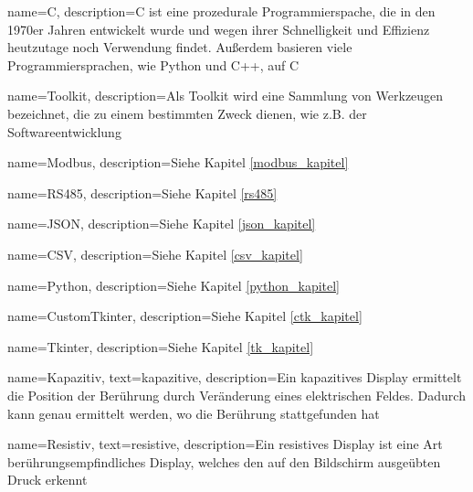 {
	name=C,
	description={C ist eine prozedurale Programmierspache, die in den 1970er Jahren entwickelt wurde und wegen ihrer Schnelligkeit und Effizienz heutzutage noch Verwendung findet. Außerdem basieren viele Programmiersprachen, wie \zB Python und C++, auf C}
}

{
	name=Toolkit,
	description={Als Toolkit wird eine Sammlung von Werkzeugen bezeichnet, die zu einem bestimmten Zweck dienen, wie z.B. der Softwareentwicklung}
}

{
	name=Modbus,
	description={Siehe Kapitel \ref{modbus_kapitel} }
}

{
	name=RS485,
	description={Siehe Kapitel \ref{rs485} }
}

{
	name=JSON,
	description={Siehe Kapitel \ref{json_kapitel} }
}

{
	name=CSV,
	description={Siehe Kapitel \ref{csv_kapitel} }
}

{
	name=Python,
	description={Siehe Kapitel \ref{python_kapitel} }
}

{
	name=CustomTkinter,
	description={Siehe Kapitel \ref{ctk_kapitel} }
}

{
	name=Tkinter,
	description={Siehe Kapitel \ref{tk_kapitel} }
}

{
	name=Kapazitiv,
    	text=kapazitive,
	description={Ein kapazitives Display ermittelt die Position der Berührung durch Veränderung eines elektrischen Feldes. Dadurch kann genau ermittelt werden, wo die Berührung stattgefunden hat}
}

{
	name=Resistiv,
    	text=resistive,
	description={Ein resistives Display ist eine Art berührungsempfindliches Display, welches den auf den Bildschirm ausgeübten Druck erkennt}
}